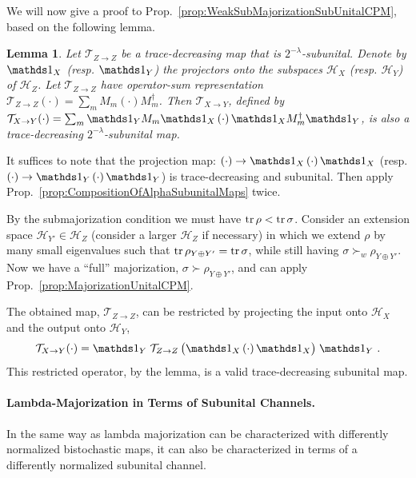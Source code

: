 \documentclass[10pt,letterpaper]{article}
\theoremstyle{plain}
\newtheorem{lemma}[thm]{Lemma}
\def\Hs{\mathscr{H}}%
\newenvironment{myproof}[1][\proofname]{%
  \color{prooftextcolor} \footnotesize \proof[\itshape #1]\hspace*{1.2mm}%
}{\endproof}
\begin{document}
We will now give a proof to Prop.~\ref{prop:WeakSubMajorizationSubUnitalCPM}, based on the following lemma.
\begin{lemma}
  \label{lemma:AlphaSubUnitalCompWithProj}
  Let $\mathcal{T}_{Z\rightarrow Z}$ be a trace-decreasing map that is $2^{-\lambda}$-subunital. Denote by
  $\Ident_X$ (resp. $\Ident_Y$) the projectors onto the subspaces $\Hs_X$ (resp. $\Hs_Y$) of $\Hs_Z$. Let
  $\mathcal{T}_{Z\rightarrow Z}$ have operator-sum representation
  $\mathcal{T}_{Z\rightarrow Z}(\cdot) = \sum_m M_m\left(\cdot\right)M_m^\dagger$. Then
  $\mathcal{T}_{X\rightarrow Y}$, defined by
  $\mathcal{T}_{X\rightarrow Y}(\cdot) = \sum_m \Ident_Y M_m\Ident_X \left(\cdot\right) \Ident_X M_m^\dagger\Ident_Y$,
  is also a trace-decreasing $2^{-\lambda}$-subunital map.
\end{lemma}
\begin{myproof}[Proof of Lemma~\ref{lemma:AlphaSubUnitalCompWithProj}]
  It suffices to note that the projection map: $\left(\cdot\right) \rightarrow \Ident_X \left(\cdot\right) \Ident_X$
  (resp. $\left(\cdot\right) \rightarrow \Ident_Y \left(\cdot\right) \Ident_Y$) is trace-decreasing and subunital.
  Then apply Prop.~\ref{prop:CompositionOfAlphaSubunitalMaps} twice.
\end{myproof}

\begin{myproof}[Proof of Prop.~\ref{prop:WeakSubMajorizationSubUnitalCPM}]
  By the submajorization condition we must have $\operatorname{tr}\rho < \operatorname{tr}\sigma$. Consider an extension space
  $\Hs_{Y'}\in\Hs_Z$ (consider a larger $\Hs_Z$ if necessary) in which we extend $\rho$ by many small
  eigenvalues such that $\operatorname{tr} \rho_{Y\oplus Y'} = \operatorname{tr}\sigma$, while still having $\sigma \succ_w \rho_{Y\oplus Y'}$.
  Now we have a ``full'' majorization, $\sigma\succ\rho_{Y\oplus Y'}$, and can apply
  Prop.~\ref{prop:MajorizationUnitalCPM}.

  The obtained map, $\mathcal{T}_{Z\rightarrow Z}$, can be restricted by projecting the input onto $\Hs_X$
  and the output onto $\Hs_Y$,
  \begin{align*}
    \mathcal{T}_{X\rightarrow Y}(\cdot)
    = \Ident_Y\; \mathcal{T}_{Z\rightarrow Z}\,\bigl(\Ident_X \left(\cdot\right) \Ident_X \bigr)\; \Ident_Y\ .
  \end{align*}
  This restricted operator, by the lemma, is a valid trace-decreasing subunital map.
\end{myproof}

\paragraph{Lambda-Majorization in Terms of Subunital Channels.}
In the same way as lambda majorization can be characterized with differently normalized bistochastic maps,
it can also be characterized in terms of a differently normalized subunital channel.
\end{document}
